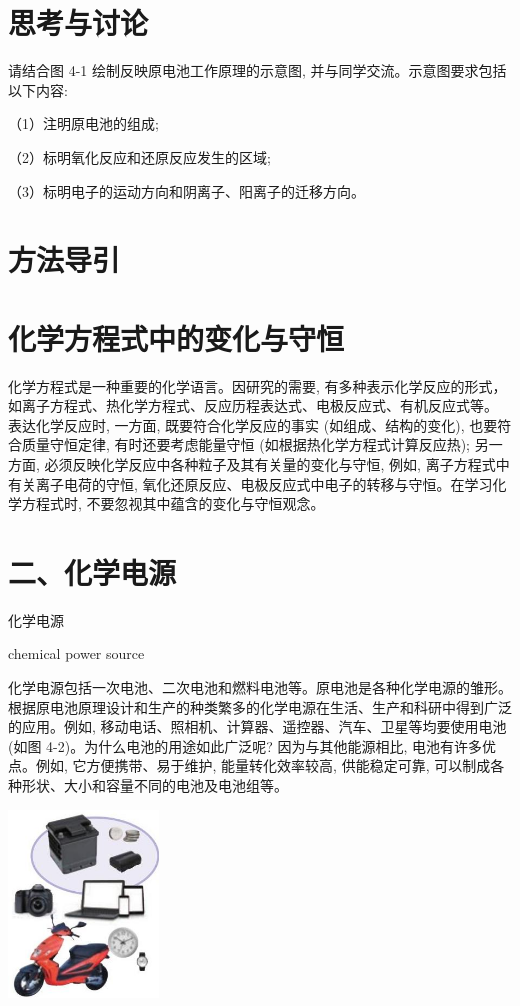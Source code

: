 \documentclass[10pt]{article}
\begin{document}
\section*{思考与讨论}

请结合图 4-1 绘制反映原电池工作原理的示意图, 并与同学交流。示意图要求包括以下内容:

（1）注明原电池的组成;

（2）标明氧化反应和还原反应发生的区域;

（3）标明电子的运动方向和阴离子、阳离子的迁移方向。

\section*{方法导引}

\section*{化学方程式中的变化与守恒}

化学方程式是一种重要的化学语言。因研究的需要, 有多种表示化学反应的形式，如离子方程式、热化学方程式、反应历程表达式、电极反应式、有机反应式等。 表达化学反应时, 一方面, 既要符合化学反应的事实 (如组成、结构的变化), 也要符合质量守恒定律, 有时还要考虑能量守恒 (如根据热化学方程式计算反应热); 另一方面, 必须反映化学反应中各种粒子及其有关量的变化与守恒, 例如, 离子方程式中有关离子电荷的守恒, 氧化还原反应、电极反应式中电子的转移与守恒。在学习化学方程式时, 不要忽视其中蕴含的变化与守恒观念。

\section*{二、化学电源}

\begin{mdframed}

化学电源

chemical power source

\end{mdframed}

化学电源包括一次电池、二次电池和燃料电池等。原电池是各种化学电源的雏形。根据原电池原理设计和生产的种类繁多的化学电源在生活、生产和科研中得到广泛的应用。例如, 移动电话、照相机、计算器、遥控器、汽车、卫星等均要使用电池 (如图 4-2)。为什么电池的用途如此广泛呢? 因为与其他能源相比, 电池有许多优点。例如, 它方便携带、易于维护, 能量转化效率较高, 供能稳定可靠, 可以制成各种形状、大小和容量不同的电池及电池组等。

\begin{center}
\includegraphics[max width=0.3\textwidth]{images/0190da9d-8bfd-732f-bc2c-0b21d0f13b91_103_712542.jpg}
\end{center}
\end{document}
